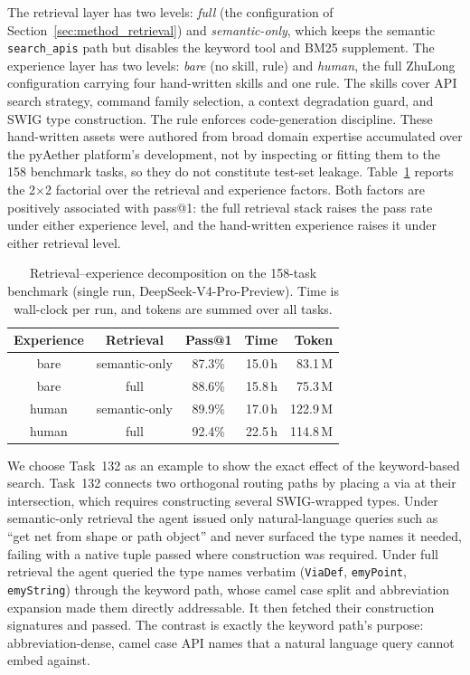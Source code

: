 \documentclass[conference]{IEEEtran}
\begin{document}
The retrieval layer has two levels: \emph{full} (the configuration of Section~\ref{sec:method_retrieval}) and \emph{semantic-only}, which keeps the semantic \texttt{search\_apis} path but disables the keyword tool and BM25 supplement. The experience layer has two levels: \emph{bare} (no skill, rule) and \emph{human}, the full ZhuLong configuration carrying four hand-written skills and one rule. The skills cover API search strategy, command family selection, a context degradation guard, and SWIG type construction. The rule enforces code-generation discipline. These hand-written assets were authored from broad domain expertise accumulated over the pyAether platform's development, not by inspecting or fitting them to the 158 benchmark tasks, so they do not constitute test-set leakage.
Table~\ref{tab:retrieval_ablation} reports the 2$\times$2 factorial over the retrieval and experience factors. Both factors are positively associated with pass@1: the full retrieval stack raises the pass rate under either experience level, and the hand-written experience raises it under either retrieval level.

\begin{table}[h]
\caption{Retrieval--experience decomposition on the 158-task benchmark (single run, DeepSeek-V4-Pro-Preview). Time is wall-clock per run, and tokens are summed over all tasks.}
\label{tab:retrieval_ablation}
\centering
\begin{tabular}{cccrr}
\toprule
Experience & Retrieval & Pass@1 & Time & Token \\
\midrule
bare  & semantic-only & 87.3\% & 15.0\,h & 83.1\,M \\
bare  & full          & 88.6\% & 15.8\,h & 75.3\,M \\
human & semantic-only & 89.9\% & 17.0\,h & 122.9\,M \\
human & full          & 92.4\% & 22.5\,h & 114.8\,M \\
\bottomrule
\end{tabular}
\end{table}

We choose Task~132 as an example to show the exact effect of the keyword-based search. Task~132 connects two orthogonal routing paths by placing a via at their intersection, which requires constructing several SWIG-wrapped types. Under
semantic-only retrieval the agent issued only natural-language queries such as ``get net from shape or path object'' and never surfaced the type names it needed, failing with a native tuple passed where construction was required.
Under full retrieval the agent queried the type names verbatim
(\texttt{ViaDef}, \texttt{emyPoint}, \texttt{emyString}) through the keyword path, whose camel case split and abbreviation expansion made them directly addressable. It then fetched their construction signatures and passed. The
contrast is exactly the keyword path's purpose: abbreviation-dense, camel case API names that a natural language query cannot embed against.
\end{document}
